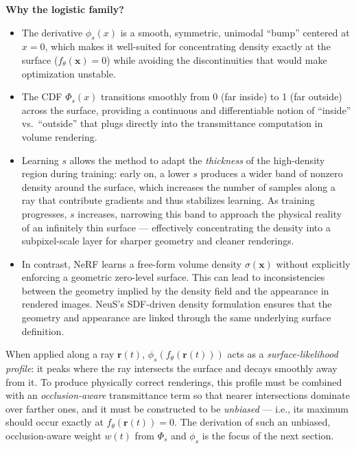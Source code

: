 \begin{enrichment}
\begin{enrichment}
        \noindent\textbf{Why the logistic family?}  
        \begin{itemize}
            \item The derivative \(\phi_s(x)\) is a smooth, symmetric, unimodal “bump” centered at \(x=0\), which makes it well-suited for concentrating density exactly at the surface (\(f_\theta(\mathbf{x}) = 0\)) while avoiding the discontinuities that would make optimization unstable.
            \item The CDF \(\Phi_s(x)\) transitions smoothly from 0 (far inside) to 1 (far outside) across the surface, providing a continuous and differentiable notion of “inside” vs.\ “outside” that plugs directly into the transmittance computation in volume rendering.
            \item Learning \(s\) allows the method to adapt the \emph{thickness} of the high-density region during training: early on, a lower \(s\) produces a wider band of nonzero density around the surface, which increases the number of samples along a ray that contribute gradients and thus stabilizes learning. As training progresses, \(s\) increases, narrowing this band to approach the physical reality of an infinitely thin surface — effectively concentrating the density into a subpixel-scale layer for sharper geometry and cleaner renderings.
            \item In contrast, NeRF learns a free-form volume density \(\sigma(\mathbf{x})\) without explicitly enforcing a geometric zero-level surface. This can lead to inconsistencies between the geometry implied by the density field and the appearance in rendered images. NeuS’s SDF-driven density formulation ensures that the geometry and appearance are linked through the same underlying surface definition.
        \end{itemize}
        
        When applied along a ray \(\mathbf{r}(t)\), \(\phi_s(f_\theta(\mathbf{r}(t)))\) acts as a \emph{surface-likelihood profile}: it peaks where the ray intersects the surface and decays smoothly away from it.  
        To produce physically correct renderings, this profile must be combined with an \emph{occlusion-aware} transmittance term so that nearer intersections dominate over farther ones, and it must be constructed to be \emph{unbiased} — i.e., its maximum should occur exactly at \(f_\theta(\mathbf{r}(t)) = 0\).  
        The derivation of such an unbiased, occlusion-aware weight \(w(t)\) from \(\Phi_s\) and \(\phi_s\) is the focus of the next section.
        

\end{enrichment}
\end{enrichment}

